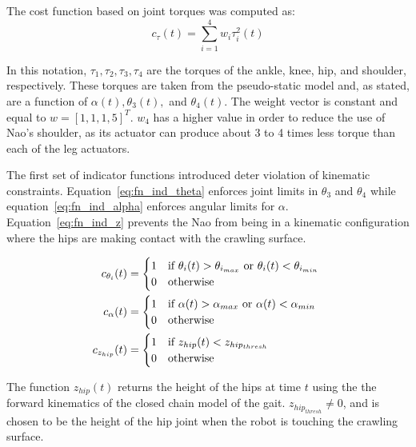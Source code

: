 The cost function based on joint torques was computed as:
\begin{equation}
	c_{\tau}(t) = \sum_{i=1}^4 w_i \tau_i^2(t) \label{eq:cost_joint}
\end{equation}

In this notation, $\tau_1, \tau_2, \tau_3, \tau_4$ are the torques of the ankle, knee, hip, and shoulder, respectively.
These torques are taken from the pseudo-static model and, as stated, are a function of 
$\alpha(t), \theta_3(t),$ and $\theta_4(t)$.
The weight vector is constant and equal to $w = [1, 1, 1, 5]^T$.
$w_4$ has a higher value in order to reduce the use of Nao's shoulder, as its actuator can produce about 3 to 4 times
less torque than each of the leg actuators.

The first set of indicator functions introduced deter violation of kinematic constraints.
Equation~\ref{eq:fn_ind_theta} enforces joint limits in $\theta_3$ and $\theta_4$ while
equation~\ref{eq:fn_ind_alpha} enforces angular limits for $\alpha$.
Equation~\ref{eq:fn_ind_z} prevents the Nao from being in a kinematic configuration where the hips are making contact
with the crawling surface.

\begin{align}
	c_{\theta_i}(t) &=
  	\begin{cases} 
  		\hfill 1 \hfill & \text{if $\theta_i (t) > \theta_{i_{max}}$ or $\theta_i (t) < \theta_{i_{min}}$ } \\
    	\hfill 0 \hfill & \text{otherwise}
  	\end{cases} \label{eq:fn_ind_theta} \\
  c_{\alpha}(t) &=
  	\begin{cases} 
    	\hfill 1 \hfill & \text{if $\alpha(t) > \alpha_{max}$ or $\alpha(t) < \alpha_{min}$ } \\
      \hfill 0 \hfill & \text{otherwise}
  	\end{cases} \label{eq:fn_ind_alpha} \\
	c_{z_{hip}}(t) &=
  	\begin{cases} 
    	\hfill 1 \hfill & \text{if $z_{hip}(t) < z_{hip_{thresh}}$ } \\
      \hfill 0 \hfill & \text{otherwise}
  	\end{cases} \label{eq:fn_ind_z}
\end{align}

The function $z_{hip}(t)$ returns the height of the hips at time $t$ using the the forward kinematics of the
closed chain model of the gait. $z_{hip_{thresh}} \ne 0$, and is chosen to be the height of the hip joint when
the robot is touching the crawling surface.

